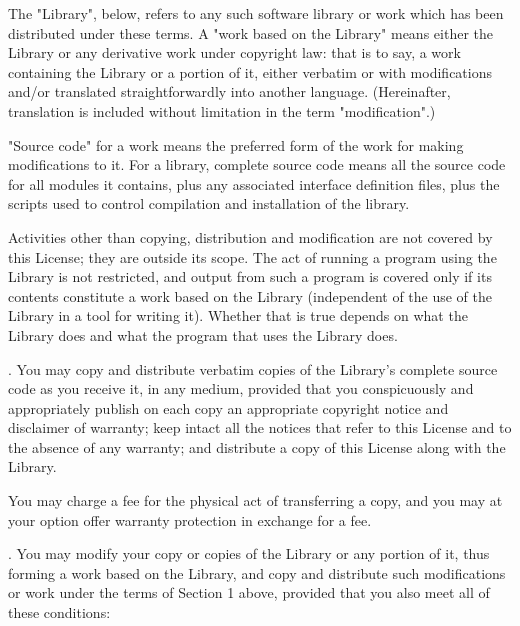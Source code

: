 The "Library", below, refers to any such software library or work which has been distributed under these terms. A "work based on the Library" means either the Library or any derivative work under copyright law: that is to say, a work containing the Library or a portion of it, either verbatim or with modifications and/or translated straightforwardly into another language. (Hereinafter, translation is included without limitation in the term "modification".) 

"Source code" for a work means the preferred form of the work for making modifications to it. For a library, complete source code means all the source code for all modules it contains, plus any associated interface definition files, plus the scripts used to control compilation and installation of the library. 

Activities other than copying, distribution and modification are not covered by this License; they are outside its scope. The act of running a program using the Library is not restricted, and output from such a program is covered only if its contents constitute a work based on the Library (independent of the use of the Library in a tool for writing it). Whether that is true depends on what the Library does and what the program that uses the Library does. 

. You may copy and distribute verbatim copies of the Library's complete source code as you receive it, in any medium, provided that you conspicuously and appropriately publish on each copy an appropriate copyright notice and disclaimer of warranty; keep intact all the notices that refer to this License and to the absence of any warranty; and distribute a copy of this License along with the Library. 

You may charge a fee for the physical act of transferring a copy, and you may at your option offer warranty protection in exchange for a fee. 

. You may modify your copy or copies of the Library or any portion of it, thus forming a work based on the Library, and copy and distribute such modifications or work under the terms of Section 1 above, provided that you also meet all of these conditions: 


